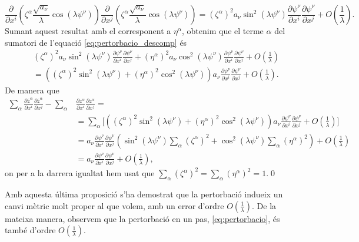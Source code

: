 {\begin{equation*}
    \frac{\partial}{\partial x^i}\left( \zeta^\alpha\frac{\sqrt{a_\nu}}{\lambda}\cos(\lambda \psi^\nu)\right) \frac{\partial}{\partial x^j}\left( \zeta^\alpha\frac{\sqrt{a_\nu}}{\lambda}\cos(\lambda \psi^\nu)\right) = 
    (\zeta^\alpha)^2{a_\nu}\sin^2(\lambda \psi^\nu)\frac{\partial\psi^\nu}{\partial x^i}\frac{\partial\psi^\nu}{\partial x^j} + O\left(\frac1\lambda\right).
\end{equation*}
Sumant aquest resultat amb el corresponent a $\eta^\alpha$, obtenim que el terme $\alpha$ del sumatori de l'equació \ref{eq:pertorbacio_descomp} és
\begin{align*}
    &(\zeta^\alpha)^2{a_\nu}\sin^2(\lambda \psi^\nu)\frac{\partial\psi^\nu}{\partial x^i}\frac{\partial\psi^\nu}{\partial x^j} + (\eta^\alpha)^2{a_\nu}\cos^2(\lambda \psi^\nu)\frac{\partial\psi^\nu}{\partial x^i}\frac{\partial\psi^\nu}{\partial x^j} + O\left(\frac1\lambda\right)
    \\&=
    ((\zeta^\alpha)^2\sin^2(\lambda \psi^\nu) + (\eta^\alpha)^2\cos^2(\lambda \psi^\nu)) a_\nu\frac{\partial\psi^\nu}{\partial x^i}\frac{\partial\psi^\nu}{\partial x^j} + O\left(\frac1\lambda\right).
\end{align*}
De manera que 
\begin{align*}
    \sum_\alpha\frac{\partial\overline{z}^\alpha}{\partial x^i}\frac{\partial\overline{z}^\alpha}{\partial x^j}-\sum_\alpha&\frac{\partial z^\alpha}{\partial x^i}\frac{\partial z^\alpha}{\partial x^j}=\\
    &=
    \sum_{\alpha}\Bigg[((\zeta^\alpha)^2\sin^2(\lambda \psi^\nu) + (\eta^\alpha)^2\cos^2(\lambda \psi^\nu)) a_\nu\frac{\partial\psi^\nu}{\partial x^i}\frac{\partial\psi^\nu}{\partial x^j}
    + O\left(\frac1\lambda\right) \Bigg]
    \\
    &=a_\nu\frac{\partial\psi^\nu}{\partial x^i}\frac{\partial\psi^\nu}{\partial x^j}\left( \sin^2(\lambda \psi^\nu)\sum_\alpha(\zeta^\alpha)^2 + \cos^2(\lambda \psi^\nu)\sum_\alpha(\eta^\alpha)^2\right) + O\left(\frac1\lambda\right)
    \\&=
    a_\nu\frac{\partial\psi^\nu}{\partial x^i}\frac{\partial\psi^\nu}{\partial x^j} + O\left(\frac1\lambda\right),
\end{align*}
on per a la darrera igualtat hem usat que $\sum_\alpha(\zeta^\alpha)^2 = \sum_\alpha(\eta^\alpha)^2 = 1$.\qed
}

Amb aquesta última proposició s'ha demostrat que la pertorbació indueix un canvi mètric molt proper al que volem, amb un error d'ordre $O\left(\frac1\lambda\right)$. De la mateixa manera, observem que la pertorbació en un pas, \ref{eq:pertorbacio}, és també d'ordre $O\left(\frac1\lambda\right)$. 

